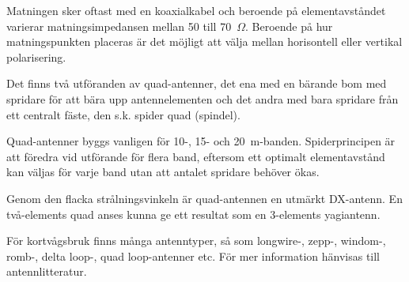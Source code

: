 Matningen sker oftast med en koaxialkabel och beroende på elementavståndet
varierar matningsimpedansen mellan 50 till 70~\(\Omega\).
Beroende på hur matningspunkten placeras är det möjligt att välja mellan
horisontell eller vertikal polarisering.

Det finns två utföranden av quad-antenner, det ena med en bärande bom
med spridare för att bära upp antennelementen och det andra med bara
spridare från ett centralt fäste, den s.k. spider quad (spindel).

Quad-antenner byggs vanligen för 10-, 15- och 20~m-banden.
Spiderprincipen är att föredra vid utförande för flera band, eftersom ett
optimalt elementavstånd kan väljas för varje band utan att antalet spridare
behöver ökas.

Genom den flacka strålningsvinkeln är quad-antennen en utmärkt DX-antenn.
En två-elements quad anses kunna ge ett resultat som en 3-elements yagiantenn.

För kortvågsbruk finns många antenntyper, så som longwire-, zepp-,
windom-, romb-, delta loop-, quad loop-antenner etc. För mer
information hänvisas till antennlitteratur.
